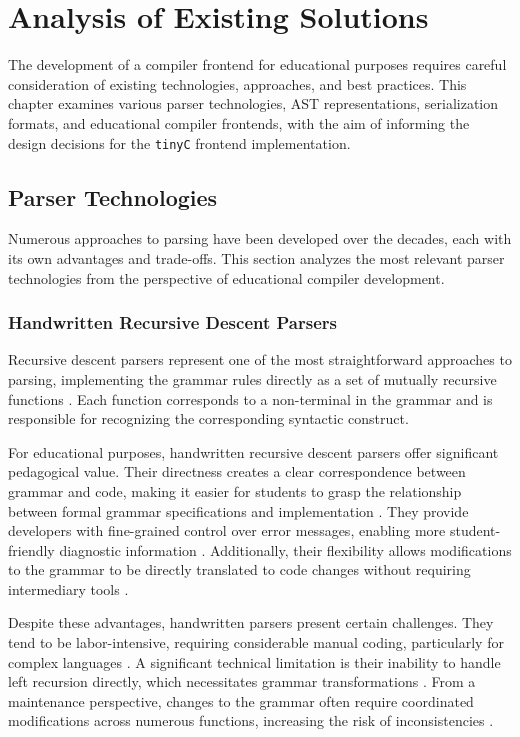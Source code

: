 \chapter{Analysis of Existing Solutions}

The development of a compiler frontend for educational purposes requires careful consideration of existing technologies, approaches, and best practices. This chapter examines various parser technologies, AST representations, serialization formats, and educational compiler frontends, with the aim of informing the design decisions for the \texttt{tinyC} frontend implementation.

\section{Parser Technologies}

Numerous approaches to parsing have been developed over the decades, each with its own advantages and trade-offs. This section analyzes the most relevant parser technologies from the perspective of educational compiler development.

\subsection{Handwritten Recursive Descent Parsers}

Recursive descent parsers represent one of the most straightforward approaches to parsing, implementing the grammar rules directly as a set of mutually recursive functions \cite{aho2007compilers}. Each function corresponds to a non-terminal in the grammar and is responsible for recognizing the corresponding syntactic construct.

For educational purposes, handwritten recursive descent parsers offer significant pedagogical value. Their directness creates a clear correspondence between grammar and code, making it easier for students to grasp the relationship between formal grammar specifications and implementation \cite{parr2010language}. They provide developers with fine-grained control over error messages, enabling more student-friendly diagnostic information \cite{holub1990compiler}. Additionally, their flexibility allows modifications to the grammar to be directly translated to code changes without requiring intermediary tools \cite{grune2012modern}.

Despite these advantages, handwritten parsers present certain challenges. They tend to be labor-intensive, requiring considerable manual coding, particularly for complex languages \cite{grune2012modern}. A significant technical limitation is their inability to handle left recursion directly, which necessitates grammar transformations \cite{aho2007compilers}. From a maintenance perspective, changes to the grammar often require coordinated modifications across numerous functions, increasing the risk of inconsistencies \cite{crenshaw1988lets}.


